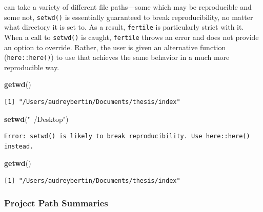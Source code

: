 \documentclass[12pt,twoside]{reedthesis}
\newenvironment{Shaded}{\begin{snugshade}}{\end{snugshade}}
\newcommand{\KeywordTok}[1]{\textcolor[rgb]{0.13,0.29,0.53}{\textbf{#1}}}
\newcommand{\StringTok}[1]{\textcolor[rgb]{0.31,0.60,0.02}{#1}}
\newcommand{\NormalTok}[1]{#1}
\begin{document}
can take a variety of different file paths---some which may be
reproducible and some not, \texttt{setwd()} is essentially guaranteed to
break reproducibility, no matter what directory it is set to. As a
result, \texttt{fertile} is particularly strict with it. When a call to
\texttt{setwd()} is caught, \texttt{fertile} throws an error and does
not provide an option to override. Rather, the user is given an
alternative function (\texttt{here::here()}) to use that achieves the
same behavior in a much more reproducible way.
\begin{Shaded}
\begin{Highlighting}[]
\KeywordTok{getwd}\NormalTok{()}
\end{Highlighting}
\end{Shaded}
\begin{verbatim}
[1] "/Users/audreybertin/Documents/thesis/index"
\end{verbatim}
\begin{Shaded}
\begin{Highlighting}[]
\KeywordTok{setwd}\NormalTok{(}\StringTok{"~/Desktop"}\NormalTok{)}
\end{Highlighting}
\end{Shaded}
\begin{verbatim}
Error: setwd() is likely to break reproducibility. Use here::here() instead.
\end{verbatim}
\begin{Shaded}
\begin{Highlighting}[]
\KeywordTok{getwd}\NormalTok{()}
\end{Highlighting}
\end{Shaded}
\begin{verbatim}
[1] "/Users/audreybertin/Documents/thesis/index"
\end{verbatim}
\subsubsection{Project Path Summaries}\label{project-path-summaries}
\end{document}
